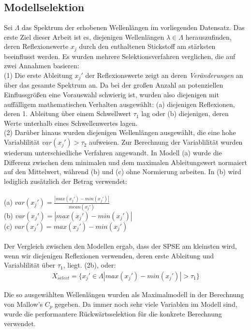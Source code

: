 	\subsection{Modellselektion}
	\label{ssec:modellselektion}
	Sei $\Lambda$ das Spektrum der erhobenen Wellenlängen im vorliegenden Datensatz.
	Das erste Ziel dieser Arbeit ist es, diejenigen Wellenlängen $\lambda\in\Lambda$ herauszufinden, deren Reflexionswerte $x_j$ durch den enthaltenen Stickstoff am stärksten beeinflusst werden.  
	Es wurden mehrere Selektionsverfahren verglichen, die auf zwei Annahmen basieren: \\
	(1) Die erste Ableitung $x_j'$ der Reflexionswerte zeigt an deren \textit{Veränderungen} an über das gesamte Spektrum an. 
	Da bei der großen Anzahl an potenziellen Einflussgrößen eine Vorauswahl schwierig ist, wurden also diejenigen mit auffälligem mathematischen Verhalten ausgewählt: (a) diejenigen Reflexionen, deren 1. Ableitung über einem Schwellwert $\tau_1$ lag oder (b) diejenigen, deren Werte unterhalb eines Schwellenwertes lagen.\\
	(2) Darüber hinaus wurden diejenigen Wellenlängen ausgewählt, die eine hohe Variablilität $var(x_j') > \tau_2$ aufweisen. 
	Zur Berechnung der Variablilität wurden wiederum unterschiedliche Verfahren angewandt. In Modell (a) wurde die Differenz zwischen dem minimalen und dem maximalen Ableitungswert normaiert auf den Mittelwert, während (b) und (c) ohne Normierung arbeiten. In (b) wird lediglich zusätzlich der Betrag verwendet: 	\\ \\
	(a) $var(x_j') = \frac{|max(x_j') - min(x_j')|}{mean(x_j')}$\\
	(b) $var(x_j') = |max(x_j') - min(x_j')|$\\
	(c) $var(x_j')= max(x_j') - min(x_j')$\\ \\
	Der Vergleich zwischen den Modellen ergab, dass der SPSE am kleinsten wird, wenn wir diejenigen Reflexionen verwenden, deren erste Ableitung und Variablilität über $\tau_1$, liegt. (2b), oder:
	\begin{align*}
		X_{select} = \{x_j' \in \Lambda |max(x_j') - min(x_j')| > \tau_1\}
	\end{align*}

	Die so ausgewählten Wellenlängen wurden als Maximalmodell in der Berechnung von Mallow's $C_p$ gegeben. 
	Da immer noch sehr viele Variablen im Modell sind, wurde die performantere Rückwärtsselektion für die konkrete Berechnung verwendet.

